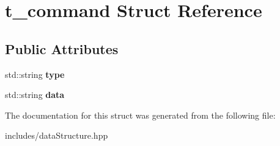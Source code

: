 \section{t\+\_\+command Struct Reference}
\label{structt__command}
\subsection*{Public Attributes}
\begin{DoxyCompactItemize}
\item 
\mbox{\label{structt__command_a22825d5436cd48ba9547062884349366}} 
std\+::string {\bfseries type}
\item 
\mbox{\label{structt__command_aa5824d2c92b5eb4bb733358c2c0bacdc}} 
std\+::string {\bfseries data}
\end{DoxyCompactItemize}


The documentation for this struct was generated from the following file\+:\begin{DoxyCompactItemize}
\item 
includes/data\+Structure.\+hpp\end{DoxyCompactItemize}
